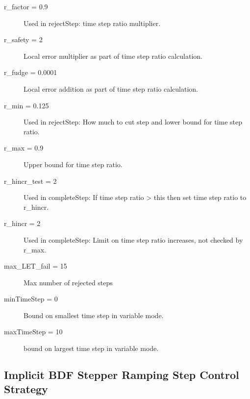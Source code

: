 \begin{list}{}
\begin{description}
      \item[r\_factor = 0.9] 
Used in rejectStep:  time step ratio multiplier.
      \item[r\_safety = 2] 
Local error multiplier as part of time step ratio calculation.
      \item[r\_fudge = 0.0001] 
Local error addition as part of time step ratio calculation.
      \item[r\_min = 0.125] 
Used in rejectStep:  How much to cut step and lower bound for time step ratio.
      \item[r\_max = 0.9] 
Upper bound for time step ratio.
      \item[r\_hincr\_test = 2] 
Used in completeStep:  If time step ratio > this then set time step ratio to r\_hincr.
      \item[r\_hincr = 2] 
Used in completeStep:  Limit on time step ratio increases, not checked by r\_max.
      \item[max\_LET\_fail = 15] 
Max number of rejected steps
      \item[minTimeStep = 0] 
Bound on smallest time step in variable mode.
      \item[maxTimeStep = 10] 
bound on largest time step in variable mode.
\end{description}

\end{list}

\subsection{Implicit BDF Stepper Ramping Step Control Strategy}
\label{sec:Implicit BDF Stepper Ramping Step Control Strategy}

